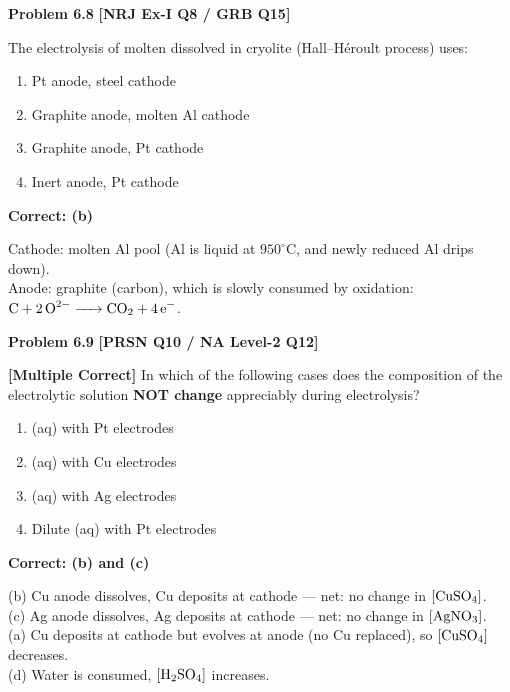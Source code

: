 \begin{problembox}
\textbf{Problem 6.8} \hfill \textbf{[NRJ Ex-I Q8 / GRB Q15]}

The electrolysis of molten  dissolved in cryolite (Hall--H\'{e}roult process) uses:
\begin{enumerate}[label=(\alph*)]
    \item Pt anode, steel cathode
    \item Graphite anode, molten Al cathode
    \item Graphite anode, Pt cathode
    \item Inert anode, Pt cathode
\end{enumerate}
\end{problembox}
\begin{solution}
\textbf{Correct: (b)}

Cathode: molten Al pool (Al is liquid at $950^\circ\text{C}$, and newly reduced Al drips down).\\
Anode: graphite (carbon), which is slowly consumed by oxidation: $\ce{C + 2O^2- -> CO2 + 4e-}$.
\end{solution}

\begin{problembox}
\textbf{Problem 6.9} \hfill \textbf{[PRSN Q10 / NA Level-2 Q12]}

\textbf{[Multiple Correct]} In which of the following cases does the composition of the electrolytic solution \textbf{NOT change} appreciably during electrolysis?
\begin{enumerate}[label=(\alph*)]
    \item {}(aq) with Pt electrodes
    \item {}(aq) with Cu electrodes
    \item {}(aq) with Ag electrodes
    \item Dilute (aq) with Pt electrodes
\end{enumerate}
\end{problembox}
\begin{solution}
\textbf{Correct: (b) and (c)}

(b) Cu anode dissolves, Cu deposits at cathode --- net: no change in $[\ce{CuSO4}]$.\\
(c) Ag anode dissolves, Ag deposits at cathode --- net: no change in $[\ce{AgNO3}]$.\\
(a) Cu deposits at cathode but  evolves at anode (no Cu replaced), so $[\ce{CuSO4}]$ decreases.\\
(d) Water is consumed, $[\ce{H2SO4}]$ increases.
\end{solution}


